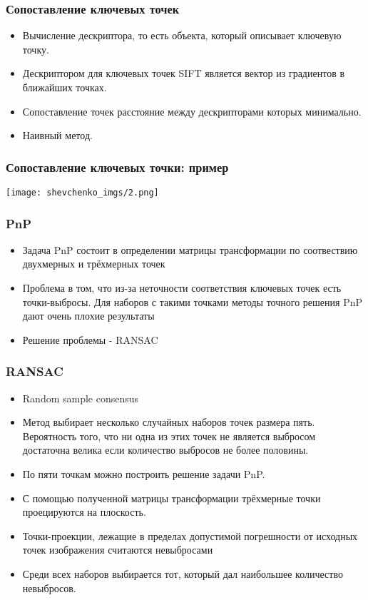 \begin{frame}\frametitle{Сопоставление ключевых точек}
    \begin{itemize}
        \item Вычисление дескриптора, то есть объекта, который описывает
            ключевую точку.
        \item Дескриптором для ключевых точек SIFT является вектор из 
            градиентов в ближайших точках.
        \item Сопоставление точек расстояние между дескрипторами которых 
            минимально.
        \item Наивный метод.
    \end{itemize}
\end{frame}
\begin{frame}\frametitle{Сопоставление ключевых точки: пример}
    \begin{center}
        \texttt{[image: shevchenko\_imgs/2.png]}
    \end{center}
\end{frame}
\begin{frame}\frametitle{PnP}
    \begin{itemize}
        \item Задача PnP состоит в определении матрицы трансформации по соотвествию двухмерных и трёхмерных точек
        \item Проблема в том, что из-за неточности соответствия ключевых точек есть точки-выбросы. 
            Для наборов с такими точками методы точного решения PnP дают очень плохие результаты
        \item Решение проблемы - RANSAC
    \end{itemize}
\end{frame}
\begin{frame}\frametitle{RANSAC}
    \begin{itemize}
        \item Random sample consensus
        \item Метод выбирает несколько случайных наборов точек размера пять. 
            Вероятность того, что ни одна из этих точек не является выбросом достаточна велика 
            если количество выбросов не более половины.
        \item По пяти точкам можно построить решение задачи PnP.
        \item С помощью полученной матрицы трансформации трёхмерные точки 
            проецируются на плоскость.
        \item Точки-проекции, лежащие в пределах допустимой погрешности от 
            исходных точек изображения считаются невыбросами
        \item Среди всех наборов выбирается тот, который дал наибольшее 
            количество невыбросов.
    \end{itemize}
\end{frame}

